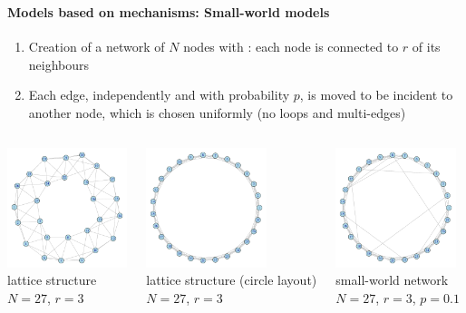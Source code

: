 \documentclass[8pt]{beamer}
\begin{document}

\begin{frame}
\frametitle{\insertsection}
\framesubtitle{Models based on mechanisms: Small-world models}

\begin{enumerate}
    \item Creation of a network of $N$ nodes with {\color{blue}{lattice structure}}: each node is connected to $r$ of its neighbours
    \item Each edge, independently and with probability $p$, is moved to be incident to another node, which is chosen uniformly (no loops and multi-edges)
 \end{enumerate}

\begin{columns}[t]

\centering
\includegraphics[width=3.5cm]{sm1}\\
\tiny{lattice structure\\
$N=27$, $r=3$}

\centering 
\includegraphics[width=3.5cm]{sm1_c}\\
\tiny{lattice structure (circle layout)\\
$N=27$, $r=3$}

\centering
\includegraphics[width=3.5cm]{sm2}\\
\tiny{small-world network\\
 $N=27$, $r=3$, $p=0.1$}

\end{columns}

\end{frame}
\end{document}
